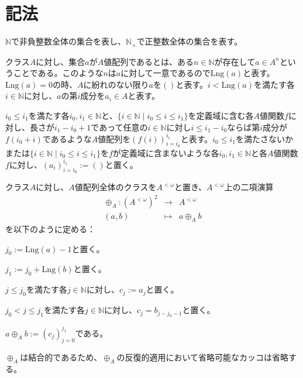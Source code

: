 \documentclass[dvipdfmx,uplatex]{jsarticle}
\theoremstyle{customnonumberbreakfortheorem}
\theoremstyle{customnonumberbreakforproof}
\begin{document}
\fi

\printbibliography[heading=bibnumbered,title={参考文献}]

\section{記法}

\(\mathbb{N}\)で非負整数全体の集合を表し、\(\mathbb{N}_{+}\)で正整数全体の集合を表す。

クラス\(A\)に対し、集合\(a\)が\(A\)値配列であるとは、ある\(n \in \mathbb{N}\)が存在して\(a \in A^n\)ということである。このような\(n\)は\(a\)に対して一意であるので\(\textrm{Lng}(a)\)と表す。\(\textrm{Lng}(a) = 0\)の時、\(A\)に紛れのない限り\(a\)を\(()\)と表す。\(i < \textrm{Lng}(a)\)を満たす各\(i \in \mathbb{N}\)に対し、\(a\)の第\(i\)成分を\(a_i \in A\)と表す。

\(i_0 \leq i_1\)を満たす各\(i_0,i_1 \in \mathbb{N}\)と、\(\{i \in \mathbb{N} \mid i_0 \leq i \leq i_1\}\)を定義域に含む各\(A\)値関数\(f\)に対し、長さが\(i_1-i_0+1\)であって任意の\(i \in \mathbb{N}\)に対し\(i \leq i_1-i_0\)ならば第\(i\)成分が\(f(i_0+i)\)であるような\(A\)値配列を\((f(i))_{i=i_0}^{i_1}\)と表す。\(i_0 \leq i_1\)を満たさないかまたは\(\{i \in \mathbb{N} \mid i_0 \leq i \leq i_1\}\)を\(f\)が定義域に含まないような各\(i_0,i_1 \in \mathbb{N}\)と各\(A\)値関数\(f\)に対し、\((a_i)_{i=i_0}^{i_1} := ()\)と置く。

クラス\(A\)に対し、\(A\)値配列全体のクラスを\(A^{< \omega}\)と置き、\(A^{< \omega}\)上の二項演算
\begin{eqnarray*}
\oplus_A \colon (A^{< \omega})^2 & \to & A^{< \omega} \\
(a,b) & \mapsto & a \oplus_A b
\end{eqnarray*}
を以下のように定める：
\begin{nenumerate}
	\item \(j_0 := \textrm{Lng}(a) - 1\)と置く。
	\item \(j_1 := j_0 + \textrm{Lng}(b)\)と置く。
	\item \(j \leq j_0\)を満たす各\(j \in \mathbb{N}\)に対し、\(c_j := a_j\)と置く。
	\item \(j_0 < j \leq j_1\)を満たす各\(j \in \mathbb{N}\)に対し、\(c_j = b_{j - j_0 - 1}\)と置く。
	\item \(a \oplus_A b := (c_j)_{j=0}^{j_1}\)である。
\end{nenumerate}

\(\oplus_A\)は結合的であるため、\(\oplus_A\)の反復的適用において省略可能なカッコは省略する。
\end{document}
